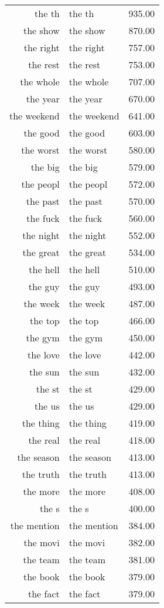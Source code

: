 \begin{table}[ht]
\begin{tabular}{rlr}
  the th & the th & 935.00 \\ 
  the show & the show & 870.00 \\ 
  the right & the right & 757.00 \\ 
  the rest & the rest & 753.00 \\ 
  the whole & the whole & 707.00 \\ 
  the year & the year & 670.00 \\ 
  the weekend & the weekend & 641.00 \\ 
  the good & the good & 603.00 \\ 
  the worst & the worst & 580.00 \\ 
  the big & the big & 579.00 \\ 
  the peopl & the peopl & 572.00 \\ 
  the past & the past & 570.00 \\ 
  the fuck & the fuck & 560.00 \\ 
  the night & the night & 552.00 \\ 
  the great & the great & 534.00 \\ 
  the hell & the hell & 510.00 \\ 
  the guy & the guy & 493.00 \\ 
  the week & the week & 487.00 \\ 
  the top & the top & 466.00 \\ 
  the gym & the gym & 450.00 \\ 
  the love & the love & 442.00 \\ 
  the sun & the sun & 432.00 \\ 
  the st & the st & 429.00 \\ 
  the us & the us & 429.00 \\ 
  the thing & the thing & 419.00 \\ 
  the real & the real & 418.00 \\ 
  the season & the season & 413.00 \\ 
  the truth & the truth & 413.00 \\ 
  the more & the more & 408.00 \\ 
  the s & the s & 400.00 \\ 
  the mention & the mention & 384.00 \\ 
  the movi & the movi & 382.00 \\ 
  the team & the team & 381.00 \\ 
  the book & the book & 379.00 \\ 
  the fact & the fact & 379.00 \\ 

\end{tabular}
\end{table}

